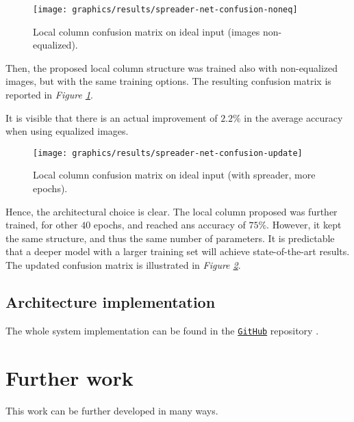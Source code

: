 \begin{figure}
	\centering
	\texttt{[image: graphics/results/spreader-net-confusion-noneq]}
	\caption{Local column confusion matrix on ideal input (images non-equalized).}\label{fig:local-confusion-noneq}
\end{figure}
\par{
	Then, the proposed local column structure was trained also with non-equalized images, but with the same training options. The resulting confusion matrix is reported in \emph{Figure \ref{fig:local-confusion-noneq}}.
}
\par{
	It is visible that there is an actual improvement of $2.2\%$ in the average accuracy when using equalized images.
}
\begin{figure}
	\centering
	\texttt{[image: graphics/results/spreader-net-confusion-update]}
	\caption{Local column confusion matrix on ideal input (with spreader, more epochs).}\label{fig:local-confusion-spreader-update}
\end{figure}
\par{
	Hence, the architectural choice is clear. The local column proposed was further trained, for other $40$ epochs, and reached ans accuracy of $75\%$. However, it kept the same structure, and thus the same number of parameters. It is predictable that a deeper model with a larger training set will achieve state-of-the-art results. The updated confusion matrix is illustrated in \emph{Figure \ref{fig:local-confusion-spreader-update}}.
}
\subsection{Architecture implementation}
\par{
	The whole system implementation can be found in the \href{https://github.com/antonioterpin/wavelet_ml}{\texttt{GitHub}} repository \cite{antonioterpin:github}.
}

\section{Further work}\label{section:further-work}
\par{
	This work can be further developed in many ways.
}
